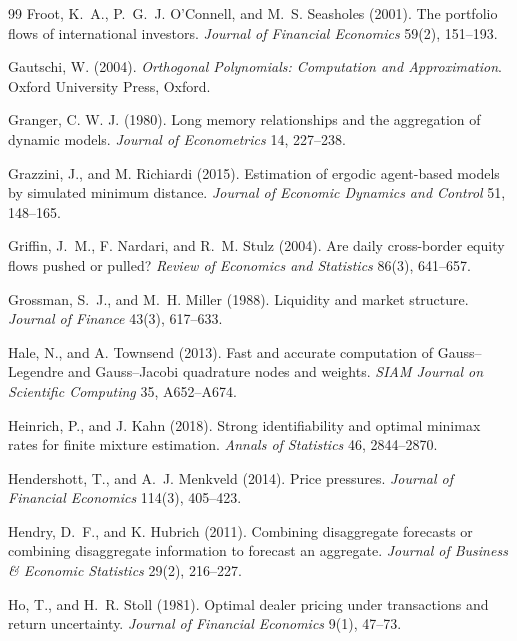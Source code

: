 \documentclass[12pt]{article}
\theoremstyle{definition}
\theoremstyle{remark}
\begin{document}
\begin{thebibliography}{99}
 Froot, K.~A., P.~G.~J. O'Connell, and M.~S. Seasholes (2001). The portfolio flows of international investors. \emph{Journal of Financial Economics} 59(2), 151--193.

 Gautschi, W. (2004). \emph{Orthogonal Polynomials: Computation and Approximation}. Oxford University Press, Oxford.

 Granger, C. W. J. (1980). Long memory relationships and the aggregation of dynamic models. \emph{Journal of Econometrics} 14, 227--238.

 Grazzini, J., and M. Richiardi (2015). Estimation of ergodic agent-based models by simulated minimum distance. \emph{Journal of Economic Dynamics and Control} 51, 148--165.

 Griffin, J.~M., F. Nardari, and R.~M. Stulz (2004). Are daily cross-border equity flows pushed or pulled? \emph{Review of Economics and Statistics} 86(3), 641--657.

 Grossman, S.~J., and M.~H. Miller (1988). Liquidity and market structure. \emph{Journal of Finance} 43(3), 617--633.

 Hale, N., and A. Townsend (2013). Fast and accurate computation of Gauss--Legendre and Gauss--Jacobi quadrature nodes and weights. \emph{SIAM Journal on Scientific Computing} 35, A652--A674.

 Heinrich, P., and J. Kahn (2018). Strong identifiability and optimal minimax rates for finite mixture estimation. \emph{Annals of Statistics} 46, 2844--2870.

 Hendershott, T., and A.~J. Menkveld (2014). Price pressures. \emph{Journal of Financial Economics} 114(3), 405--423.

 Hendry, D.~F., and K. Hubrich (2011). Combining disaggregate forecasts or combining disaggregate information to forecast an aggregate. \emph{Journal of Business \& Economic Statistics} 29(2), 216--227.

 Ho, T., and H.~R. Stoll (1981). Optimal dealer pricing under transactions and return uncertainty. \emph{Journal of Financial Economics} 9(1), 47--73.


\end{thebibliography}
\end{document}
